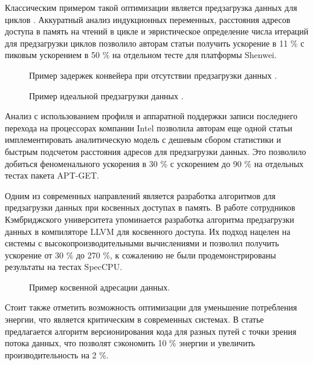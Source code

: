 Классическим примером такой оптимизации является предзагрузка данных для циклов \cite{chai2021implementation}. Аккуратный анализ индукционных переменных, расстояния адресов доступа в память на чтений в цикле и эвристическое определение числа итераций для предзагрузки циклов позволило авторам статьи \cite{chai2021implementation} получить ускорение в 11 \% с пиковым ускорением в 50 \%  на отдельном тесте для платформы Shenwei. 

 \begin{figure}[htbp]
	\centering
	
	\caption{Пример задержек конвейера при отсутствии предзагрузки данных \cite{chai2021implementation}.}
	\label{partReview:prefetch1}
\end{figure}

 \begin{figure}[htbp]
	\centering
	
	\caption{Пример идеальной предзагрузки данных \cite{chai2021implementation}.}
	\label{partReview:prefetch2}
\end{figure}

Анализ с использованием профиля и аппаратной поддержки записи последнего перехода на процессорах компании Intel позволила авторам еще одной статьи \cite{jamilan2022apt}  имплементировать аналитическую модель с дешевым сбором статистики и быстрым подсчетом расстояния адресов для предзагрузки данных. Это позволило добиться феноменального ускорения в 30 \% с ускорением до 90 \% на отдельных тестах пакета APT-GET. 

Одним из современных направлений является разработка алгоритмов для предзагрузки данных при косвенных доступах в память. В работе сотрудников Кэмбриджского университета \cite{purkayastha2020llvm}  упоминается разработка алгоритма предзагрузки данных в компиляторе LLVM для косвенного доступа. Их подход нацелен на  системы с высокопроизводительными вычислениями и позволил получить ускорение от 30 \% до 270 \%, к сожалению не были продемонстрированы результаты на тестах SpecCPU.
 \begin{figure}[htbp]
	\centering
	
	\caption{Пример косвенной адресации данных.}
	\label{partReview:prefetch3}
\end{figure}
Стоит также отметить возможность оптимизации для уменьшение потребления энергии, что является критическим в современных системах. В статье \cite{ekemark2016static} предлагается алгоритм версионирования кода для разных путей с точки зрения потока данных, что позволят сэкономить 10 \% энергии и увеличить производительность на 2 \%.


